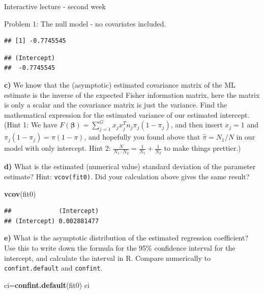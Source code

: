 \documentclass[
  ignorenonframetext,
]{beamer}
\newenvironment{Shaded}{\begin{snugshade}}{\end{snugshade}}
\newcommand{\FunctionTok}[1]{\textcolor[rgb]{0.13,0.29,0.53}{\textbf{#1}}}
\newcommand{\NormalTok}[1]{#1}
\newcommand{\OtherTok}[1]{\textcolor[rgb]{0.56,0.35,0.01}{#1}}
\newcommand{\SpecialCharTok}[1]{\textcolor[rgb]{0.81,0.36,0.00}{\textbf{#1}}}
\begin{document}
\begin{frame}[fragile]{Interactive lecture - second week}
\begin{block}{Problem 1: The null model - no covariates included.}
\begin{verbatim}
## [1] -0.7745545
\end{verbatim}

\begin{Shaded}
\end{Shaded}

\begin{verbatim}
## (Intercept) 
##  -0.7745545
\end{verbatim}

\textbf{c)} We know that the (asymptotic) estimated covariance matrix of
the ML estimate is the inverse of the expected Fisher information
matrix, here the matrix is only a scalar and the covariance matrix is
just the variance. Find the mathematical expression for the estimated
variance of our estimated intercept. (Hint 1: We have
\(F(\boldsymbol{\beta}) = \sum_{j=1}^G x_jx_j^T n_j \pi_j(1-\pi_j)\),
and then insert \(x_j = 1\) and \(\pi_j(1-\pi_j)=\pi(1-\pi)\), and
hopefully you found above that \(\hat{\pi}=N_1/N\) in our model with
only intercept. Hint 2:
\(\frac{N}{N_1 \cdot N_2}=\frac{1}{N_1}+\frac{1}{N_2}\) to make things
prettier.)

\textbf{d)} What is the estimated (numerical value) standard deviation
of the parameter estimate? Hint: \texttt{vcov(fit0)}. Did your
calculation above gives the same result?

\begin{Shaded}
\begin{Highlighting}[]
\FunctionTok{vcov}\NormalTok{(fit0)}
\end{Highlighting}
\end{Shaded}

\begin{verbatim}
##             (Intercept)
## (Intercept) 0.002881477
\end{verbatim}

\textbf{e)} What is the asymptotic distribution of the estimated
regression coefficient? Use this to write down the formula for the 95\%
confidence interval for the intercept, and calculate the interval in R.
Compare numerically to \texttt{confint.default} and \texttt{confint}.

\begin{Shaded}
\begin{Highlighting}[]
\NormalTok{ci}\OtherTok{=}\FunctionTok{confint.default}\NormalTok{(fit0)}
\NormalTok{ci}
\end{Highlighting}
\end{Shaded}


\end{block}
\end{frame}
\end{document}
